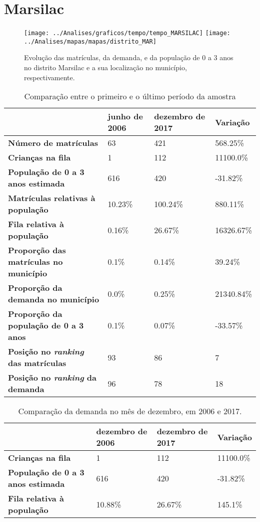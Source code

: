 \section{Marsilac}
\begin{figure}[H]
\centering
\texttt{[image: ../Analises/graficos/tempo/tempo\_MARSILAC]}
\texttt{[image: ../Analises/mapas/mapas/distrito\_MAR]}
\caption{Evolução das matrículas, da demanda, e da população de 0 a 3 anos no distrito Marsilac e a sua localização no município, respectivamente.}
\end{figure}
\begin{table}[H]
\begin{tabular}{l|l|l|l}
\textbf{}                                      & \textbf{junho de 2006}       & \textbf{dezembro de 2017}    & \textbf{Variação} \\ \hline
\textbf{Número de matrículas}                  & 63 & 421 & 568.25\% \\ \hline
\textbf{Crianças na fila}                      & 1 & 112 & 11100.0\% \\ \hline
\textbf{População de 0 a 3 anos estimada}      & 616 & 420 & -31.82\% \\ \hline
\textbf{Matrículas relativas à população}      & 10.23\% & 100.24\% & 880.11\% \\ \hline
\textbf{Fila relativa à população}             & 0.16\% & 26.67\% & 16326.67\% \\ \hline
\textbf{Proporção das matrículas no município} & 0.1\% & 0.14\% & 39.24\% \\ \hline
\textbf{Proporção da demanda no município}     & 0.0\% & 0.25\% & 21340.84\% \\ \hline
\textbf{Proporção da população de 0 a 3 anos}  & 0.1\% & 0.07\% & -33.57\% \\ \hline
\textbf{Posição no \textit{ranking} das matrículas}     & 93 & 86 & 7 \\ \hline
\textbf{Posição no \textit{ranking} da demanda}         & 96 & 78 & 18 \\ 
\end{tabular}
\caption{Comparação entre o primeiro e o último período da amostra}
\end{table}
\begin{table}[H]
\begin{tabular}{l|l|l|l}
\textbf{}                                 & \textbf{dezembro de 2006} & \textbf{dezembro de 2017} & \textbf{Variação} \\ \hline
\textbf{Crianças na fila}                      & 1 & 112 & 11100.0\% \\ \hline
\textbf{População de 0 a 3 anos estimada}      & 616 & 420 & -31.82\% \\ \hline
\textbf{Fila relativa à população}             & 10.88\% & 26.67\% & 145.1\% \\
\end{tabular}
\caption{Comparação da demanda no mês de dezembro, em 2006 e 2017.}
\end{table}
